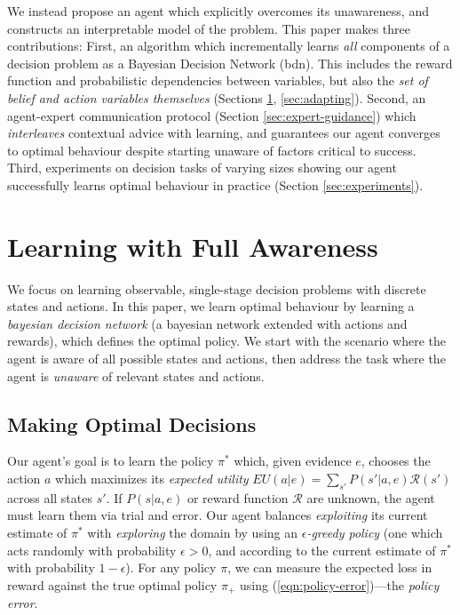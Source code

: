 \documentclass{article}
\newcommand{\bdn}{{\sc bdn}}
\begin{document}
	We instead propose an agent which explicitly overcomes its unawareness, and constructs an interpretable model of the problem. This paper makes three contributions: First, an algorithm which incrementally learns \emph{all} components of a decision problem as a Bayesian Decision Network (\bdn{}). This includes the reward function and probabilistic dependencies between variables, but also the \emph{set of belief and action variables themselves} (Sections \ref{sec:full-awareness-learn}, \ref{sec:adapting}). Second, an agent-expert communication protocol (Section \ref{sec:expert-guidance}) which \emph{interleaves} contextual advice with learning, and guarantees our agent converges to optimal behaviour despite starting unaware of factors critical to success. Third, experiments on decision tasks of varying sizes showing our agent successfully learns optimal behaviour in practice (Section \ref{sec:experiments}).
		
	\section{Learning with Full Awareness}
	\label{sec:full-awareness-learn}
		
	We focus on learning observable, single-stage decision problems with discrete states and actions. In this paper, we learn optimal behaviour by learning a \emph{bayesian decision network} (a bayesian network extended with actions and rewards), which defines the optimal policy. We start with the scenario where the agent is aware of all possible states and actions, then address the task where the agent is \emph{unaware} of relevant states and actions.

	
	\subsection{Making Optimal Decisions}
	\label{sec:optimal-decisions}
	Our agent's goal is to learn the policy $\pi^*$ which, given evidence $e$, chooses the action $a$ which maximizes its \emph{expected utility} $EU(a | e) = \sum_{s'} P(s' | a, e) \mathcal{R}(s')$ across all states $s'$. If $P(s | a, e)$ or reward function $\mathcal{R}$ are unknown, the agent must learn them via trial and error. Our agent balances \emph{exploiting} its current estimate of $\pi^*$ with \emph{exploring} the domain by using an \emph{$\epsilon$-greedy policy} (one which acts randomly with probability $\epsilon > 0$, and according to the current estimate of $\pi^*$ with probability $1 - \epsilon$). For any policy $\pi$, we can measure the expected loss in reward against the true optimal policy $\pi_+$ using (\ref{eqn:policy-error})---the \emph{policy error}.
	
\end{document}
